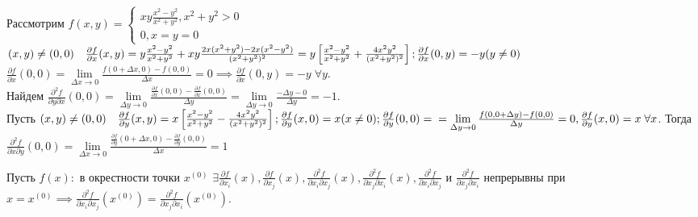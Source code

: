 \documentclass[../main.tex]{subfiles}
\begin{document}
Рассмотрим $f(x,y) = \begin{cases}
    xy \frac{ x^{2}-y^{2}}{x^{2}+y^{2}}, x^{2}+y^{2} > 0 \\ 
    0, x=y=0
\end{cases}$\\ 
$(x,y)\neq (0,0) \quad \frac{\partial{f}}{\partial{x}}(x,y)= y \frac{x^{2}-y^{2}}{x^{2}+y^{2}}+ xy \frac{2x(x^{2}+y^{2})-2x(x^{2}-y^{2})}{(x^{2}+y^{2})^{2}}= y\left[\frac{x^{2}-y^{2}}{x^{2}+y^{2}}+ \frac{4x^{2}y^{2}}{(x^{2}+y^{2})^{2}}\right]; \\ \frac{\partial{f}}{\partial{x}}(0,y)=-y (y\neq 0)$ \qquad 
$\frac{\partial{f}}{\partial{x}}(0,0) = \lim\limits_{\Delta x \to 0}\frac{f(0+\Delta x ,0)-f(0,0)}{\Delta x} = 0\implies \frac{\partial{f}}{\partial{x}}(0,y)=-y\;\forall y$. \\ 
Найдем $\frac{\partial^{2}{f}}{\partial{y}\partial{x}}(0,0)=\lim\limits_{\Delta y\to 0}\frac{\frac{\partial{f}}{\partial{x}}(0,0)-\frac{\partial{f}}{\partial{x}}(0,0)}{\Delta y} = \lim\limits_{\Delta y\to 0} \frac{ - \Delta y -0}{\Delta y} = -1.  $ 
\\Пусть $(x,y)\neq (0,0)\quad \frac{\partial{f}}{\partial{y}}(x,y) = x\left[\frac{x^{2}-y^{2}}{x^{2}+y^{2}}- \frac{4x^{2}y^{2}}{(x^{2}+y^{2})^{2}}\right]; \frac{\partial{f}}{\partial{y}}(x,0) = x (x\neq 0); \frac{\partial{f}}{\partial{y}}(0,0)=\\=\lim\limits_{ \Delta y\to 0}\frac{f(0,0+\Delta y)-f(0,0)}{\Delta y}=0, \frac{\partial{f}}{\partial{y}}(x,0) = x \; \forall x$. 
Тогда $\frac{\partial^{2}{f}}{\partial{x}\partial{y}}(0,0)= \lim\limits_{\Delta x\to 0}\frac{\frac{\partial{f}}{\partial{y}}(0+\Delta x,0)- \frac{\partial{f}}{\partial{y}}(0,0)}{\Delta x}=1 $
\vspace{0.5cm}
\begin{theorem}
    Пусть $f(x):$ в окрестности точки $x^{(0)}$ $\exists \frac{\partial{f}}{\partial{x_{i}}}(x), \frac{\partial{f}}{\partial{x_{j}}}(x), \frac{\partial^{2}{f}}{\partial{x_{i}}\partial{x_{j}}}(x), \frac{\partial^{2}{f}}{\partial{x_{j}}\partial{x_{i}}}(x), \frac{\partial^{2}{f}}{\partial{x_{i}\partial{x_{j}}}}$ и $\frac{\partial^{2}{f}}{\partial{x_{j}}\partial{x_{i}}}$ непрерывны при $x=x^{(0)}\implies \frac{\partial^{2}{f}}{\partial{x_{i}}\partial{x_{j}}}(x^{(0)})=\frac{\partial^{2}{f}}{\partial{x_{j}}\partial{x_{i}}}(x^{(0)})$.
\end{theorem}
\end{document}
